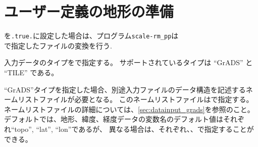 \section{ユーザー定義の地形の準備} \label{subsec:topo_userfile}

を\verb|.true.|に設定した場合は、プログラム\verb|scale-rm_pp|は \\
で指定したファイルの変換を行う.

入力データのタイプをで指定する。
サポートされているタイプは ``GrADS'' と ``TILE'' である。

``GrADS''タイプを指定した場合、別途入力ファイルのデータ構造を記述するネームリストファイルが必要となる。
このネームリストファイルはで指定する。
ネームリストファイルの詳細については、\ref{sec:datainput_grads}を参照のこと。
デフォルトでは、地形、緯度、経度データの変数名のデフォルト値はそれぞれ``topo'', ``lat'', ``lon''であるが、
異なる場合は、それぞれ、、で指定することができる。


